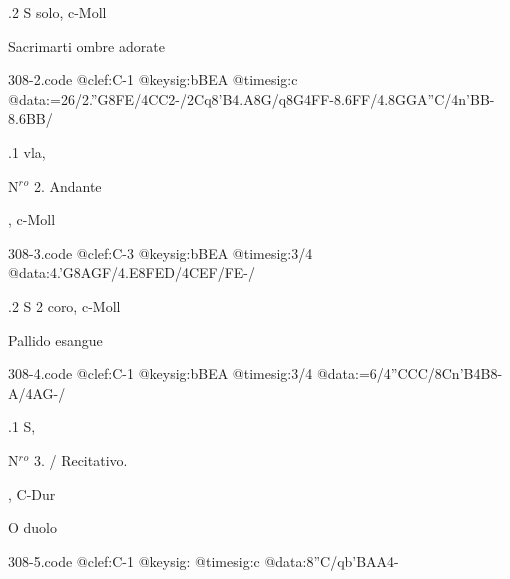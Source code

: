 \documentclass[twocolumn]{book}
\begin{document}
%
.2  S solo, c-Moll
\newline \begin{footnotesize} Sacrimarti ombre adorate \end{footnotesize}  
\begin{filecontents*}{308-2.code}
@clef:C-1
@keysig:bBEA
@timesig:c
@data:=26/2.''G{8FE}/4CC2-/2Cq8'B4.A8G/q8G4FF-8.6FF/4.8GGA''C/4n'BB-8.6BB/
\end{filecontents*}
\newline
%
.1  vla, \begin{itshape}N$^r$$^o$ 2. Andante\end{itshape}, c-Moll  
\begin{filecontents*}{308-3.code}
@clef:C-3
@keysig:bBEA
@timesig:3/4
@data:4.'G{8AGF}/4.E{8FED}/4CEF/FE-/
\end{filecontents*}
\newline
%
.2  S 2 coro, c-Moll
\newline \begin{footnotesize} Pallido esangue \end{footnotesize}  
\begin{filecontents*}{308-4.code}
@clef:C-1
@keysig:bBEA
@timesig:3/4
@data:=6/4''CCC/{8Cn'B}4B8-A/4AG-/
\end{filecontents*}
\newline
%
.1  S, \begin{itshape}N$^r$$^o$ 3. / Recitativo.\end{itshape}, C-Dur
\newline \begin{footnotesize} O duolo \end{footnotesize}  
\begin{filecontents*}{308-5.code}
@clef:C-1
@keysig:
@timesig:c
@data:8''C/qb'BAA4-
\end{filecontents*}
\end{document}
